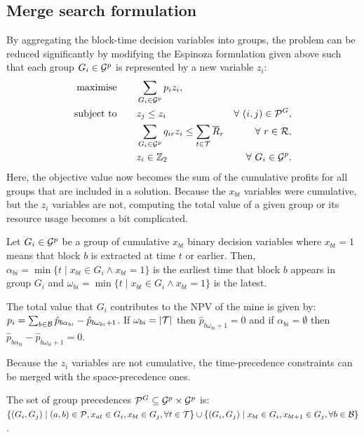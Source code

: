\documentclass[preprint]{elsarticle}
\begin{document}
\subsection*{Merge search formulation}

By aggregating the block-time decision variables into groups, the problem can be reduced significantly by modifying the Espinoza formulation given above such that each group $G_i \in \S{G}^p$ is represented by a new variable $z_i$: 
{\footnotesize
\begin{align}
\Max \qquad & \displaystyle\sum_{G_i \in \S{G}^p} p_{i}z_i,\label{eq:cpit_merge}\\
\ST \qquad & z_j \leq z_i \qquad \qquad & \forall\ (i,j) \in \mathcal{P}^G, \nonumber\\
& \displaystyle\sum_{G_i \in \S{G}^p}q_{ir}z_i \leq \displaystyle\sum_{t \in \S{T}}\overline{R}_{r} & \forall\ r \in \S{R}, \nonumber\\
& z_i \in \Bin & \forall\ G_i \in \S{G}^p \nonumber.
\end{align}
}
Here, the objective value now becomes the sum of the cumulative profits for all groups that are included in a solution. Because the $x_{bt}$ variables were cumulative, but the $z_i$ variables are not, computing the total value of a given group or its resource usage becomes a bit complicated.

\begin{definition}
Let $G_i \in \S{G}^p$ be a group of cumulative \(x_{bt}\) binary decision variables where \(x_{bt} = 1\) means that block $b$ is extracted at time $t$ or earlier. Then, \(\alpha_{bi} = \min\{t \mid x_{bt} \in G_i \land x_{bt} = 1\}\) is the earliest time that block \(b\) appears in group \(G_i\) and \(\omega_{bi} = \min\{t \mid x_{bt} \in G_i \land x_{bt} = 1\}\) is the latest.
\end{definition}

\begin{prop}\label{prop:merge-group-profit}
The total value that $G_i$ contributes to the NPV of the mine is given by: $p_i = \sum_{b \in \S{B}} \hat{p}_{b\alpha_{bi}} - \hat{p}_{b\omega_{bi}+1}$. If $\omega_{bi} = |\S{T}|$ then $\hat{p}_{b\omega_{bi}+1} = 0$ and if \(\alpha_{bi} = \emptyset\) then \(\hat{p}_{b\alpha_{bi}} - \hat{p}_{b\omega_{bi}+1} = 0\).
\end{prop}
%
Because the $z_i$ variables are not cumulative, the time-precedence constraints can be merged with the space-precedence ones. 
\begin{prop}\label{prop:merge-group-prec}
The set of group precedences $\mathcal{P}^G \subseteq \S{G}^p \times \S{G}^p$ is: $\{(G_i,G_j) \mid (a,b) \in \mathcal{P}, x_{at} \in G_i, x_{bt} \in G_j, \forall t \in \S{T}\} \cup \{(G_i,G_j) \mid x_{bt} \in G_i, x_{bt+1} \in G_j, \forall b \in \S{B}\}$.
\end{prop}
\end{document}
